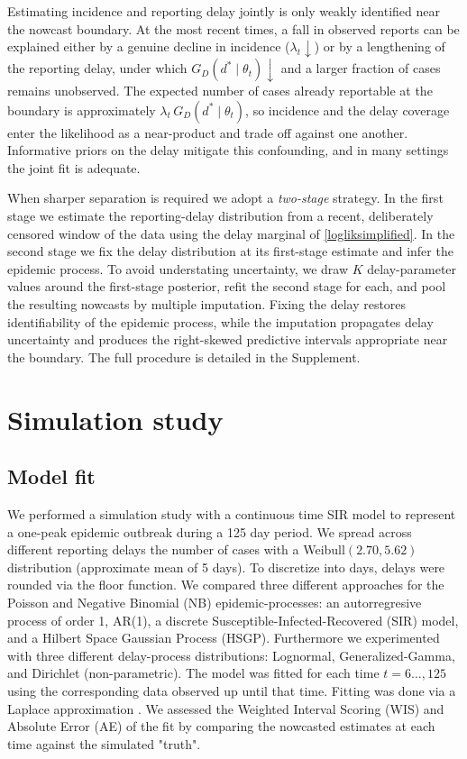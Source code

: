\documentclass[12pt]{article}
\begin{document}
{\color{red}
Estimating incidence and reporting delay jointly is only weakly identified near the nowcast boundary. At the most recent times, a fall in observed reports can be explained either by a genuine decline in incidence ($\lambda_t \downarrow$) or by a lengthening of the reporting delay, under which $G_D(d^* \mid \theta_t) \downarrow$ and a larger fraction of cases remains unobserved. The expected number of cases already reportable at the boundary is approximately $\lambda_t\, G_D(d^* \mid \theta_t)$, so incidence and the delay coverage enter the likelihood as a near-product and trade off against one another. Informative priors on the delay mitigate this confounding, and in many settings the joint fit is adequate.

When sharper separation is required we adopt a \emph{two-stage} strategy. In the first stage we estimate the reporting-delay distribution from a recent, deliberately censored window of the data using the delay marginal of \eqref{logliksimplified}. In the second stage we fix the delay distribution at its first-stage estimate and infer the epidemic process. To avoid understating uncertainty, we draw $K$ delay-parameter values around the first-stage posterior, refit the second stage for each, and pool the resulting nowcasts by multiple imputation. Fixing the delay restores identifiability of the epidemic process, while the imputation propagates delay uncertainty and produces the right-skewed predictive intervals appropriate near the boundary. The full procedure is detailed in the Supplement.
}

\section{Simulation study}

\subsection{Model fit}
We performed a simulation study with a continuous time SIR model to represent a one-peak epidemic outbreak during a 125 day period. We spread across different reporting delays the number of cases with a Weibull$(2.70, 5.62)$ distribution (approximate mean of 5 days). To discretize into days, delays were rounded via the floor function. We compared three different approaches for the Poisson and Negative Binomial (NB) epidemic-processes: an autorregresive process of order 1, AR(1), a discrete Susceptible-Infected-Recovered (SIR) model, and a Hilbert Space Gaussian Process (HSGP). Furthermore we experimented with three different delay-process distributions: Lognormal, Generalized-Gamma, and Dirichlet (non-parametric). The model was fitted for each time $t = 6\dots, 125$ using the corresponding data observed up until that time. Fitting was done via a Laplace approximation \cite{tierney1986accurate}. We assessed the Weighted Interval Scoring (WIS) and Absolute Error (AE) of the fit by comparing the nowcasted estimates at each time against the simulated  "truth". 
\end{document}
